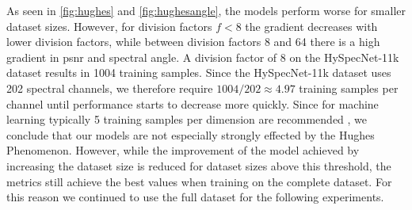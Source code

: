 As seen in \autoref{fig:hughes} and \autoref{fig:hughesangle}, the models perform worse for smaller dataset sizes. However, for division factors $f < 8$ the gradient decreases with lower division factors, while between division factors 8 and 64 there is a high gradient in \ac{psnr} and spectral angle. A division factor of 8 on the HySpecNet-11k dataset results in 1004 training samples. Since the HySpecNet-11k dataset uses 202 spectral channels, we therefore require $1004/202 \approx 4.97$ training samples per channel until performance starts to decrease more quickly. Since for machine learning typically 5 training samples per dimension are recommended \citep{theodoridis_pattern_2009}, we conclude that our models are not especially strongly effected by the Hughes Phenomenon. However, while the improvement of the model achieved by increasing the dataset size is reduced for dataset sizes above this threshold, the metrics still achieve the best values when training on the complete dataset. For this reason we continued to use the full dataset for the following experiments.
